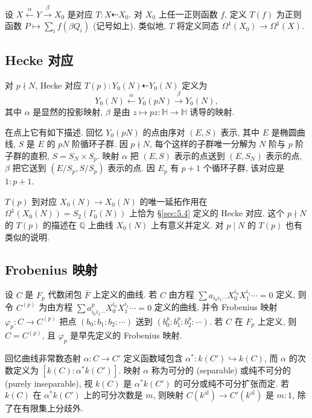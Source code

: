 \begin{remark} \label{thm:5.7.2} 
设 $X \xleftarrow{\alpha} Y \xrightarrow{\beta} X_0$ 是对应 $T\colon X\dashleftarrow X_0$. 对 $X_0$ 上任一正则函数 $f$, 定义 $T(f)$ 为正则函数 $P\mapsto\sum_i f(\beta Q_i)$ (记号如上). 类似地, $T$ 将定义同态 $\Omega^1(X_0)\to\Omega^1(X)$.
\end{remark}

\subsection*{Hecke 对应}

对 $p\nmid N$, Hecke 对应 $T(p)\colon Y_0(N)\dashleftarrow Y_0(N)$ 定义为
\[
Y_0(N) \xleftarrow{\alpha} Y_0(pN) \xrightarrow{\beta} Y_0(N),
\]
其中 $\alpha$ 是显然的投影映射, $\beta$ 是由 $z\mapsto pz\colon\mathbb{H}\to\mathbb{H}$ 诱导的映射.

在点上它有如下描述. 回忆 $Y_0(pN)$ 的点由序对 $(E, S)$ 表示, 其中 $E$ 是椭圆曲线, $S$ 是 $E$ 的 $pN$ 阶循环子群. 因 $p\nmid N$, 每个这样的子群唯一分解为 $N$ 阶与 $p$ 阶子群的直积, $S = S_N\times S_p$. 映射 $\alpha$ 把 $(E, S)$ 表示的点送到 $(E, S_N)$ 表示的点, $\beta$ 把它送到 $(E/S_p, S/S_p)$ 表示的点. 因 $E_p$ 有 $p+1$ 个循环子群, 该对应是 $1: p+1$.

$T(p)$ 到对应 $X_0(N)\to X_0(N)$ 的唯一延拓作用在 $\Omega^1(X_0(N)) = S_2(\Gamma_0(N))$ 上恰为 \S\ref{sec:5.4} 定义的 Hecke 对应. 这个 $p\nmid N$ 的 $T(p)$ 的描述在 $\mathbb{Q}$ 上曲线 $X_0(N)$ 上有意义并定义. 对 $p\mid N$ 的 $T(p)$ 也有类似的说明.

\subsection*{Frobenius 映射}

设 $C$ 是 $F_p$ 代数闭包 $\bar{F}$ 上定义的曲线. 若 $C$ 由方程 $\sum a_{i_0i_1\cdots}X_0^{i_0}X_1^{i_1}\cdots = 0$ 定义, 则令 $C^{(p)}$ 为由方程 $\sum a_{i_0i_1\cdots}^p X_0^{i_0}X_1^{i_1}\cdots = 0$ 定义的曲线, 并令 Frobenius 映射 $\varphi_p\colon C\to C^{(p)}$ 把点 $(b_0:b_1:b_2:\cdots)$ 送到 $(b_0^p:b_1^p:b_2^p:\cdots)$. 若 $C$ 在 $F_p$ 上定义, 则 $C = C^{(p)}$, 且 $\varphi_p$ 是早先定义的 Frobenius 映射.

回忆曲线非常数态射 $\alpha\colon C\to C'$ 定义函数域包含 $\alpha^*\colon k(C')\hookrightarrow k(C)$, 而 $\alpha$ 的次数定义为 $[k(C):\alpha^*k(C')]$. 映射 $\alpha$ 称为可分的 (separable) 或纯不可分的 (purely inseparable), 视 $k(C)$ 是 $\alpha^*k(C')$ 的可分或纯不可分扩张而定. 若 $k(C)$ 在 $\alpha^*k(C')$ 上的可分次数是 $m$, 则映射 $C(k^{\mathrm{al}})\to C'(k^{\mathrm{al}})$ 是 $m:1$, 除了在有限集上分歧外.


